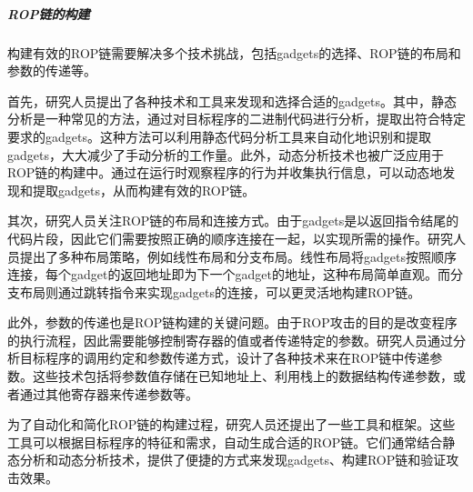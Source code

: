 \documentclass[12pt,a4paper]{ctexart}
\numberwithin{figure}{section}
\begin{document}
\subparagraph{ROP链的构建}
\par 构建有效的ROP链需要解决多个技术挑战，包括gadgets的选择、ROP链的布局和参数的传递等。
\par 首先，研究人员提出了各种技术和工具来发现和选择合适的gadgets。其中，静态分析是一种常见的方法，通过对目标程序的二进制代码进行分析，提取出符合特定要求的gadgets。这种方法可以利用静态代码分析工具来自动化地识别和提取gadgets，大大减少了手动分析的工作量。此外，动态分析技术也被广泛应用于ROP链的构建中。通过在运行时观察程序的行为并收集执行信息，可以动态地发现和提取gadgets，从而构建有效的ROP链。
\par 其次，研究人员关注ROP链的布局和连接方式。由于gadgets是以返回指令结尾的代码片段，因此它们需要按照正确的顺序连接在一起，以实现所需的操作。研究人员提出了多种布局策略，例如线性布局和分支布局。线性布局将gadgets按照顺序连接，每个gadget的返回地址即为下一个gadget的地址，这种布局简单直观。而分支布局则通过跳转指令来实现gadgets的连接，可以更灵活地构建ROP链。
\par 此外，参数的传递也是ROP链构建的关键问题。由于ROP攻击的目的是改变程序的执行流程，因此需要能够控制寄存器的值或者传递特定的参数。研究人员通过分析目标程序的调用约定和参数传递方式，设计了各种技术来在ROP链中传递参数。这些技术包括将参数值存储在已知地址上、利用栈上的数据结构传递参数，或者通过其他寄存器来传递参数等。
\par 为了自动化和简化ROP链的构建过程，研究人员还提出了一些工具和框架。这些工具可以根据目标程序的特征和需求，自动生成合适的ROP链。它们通常结合静态分析和动态分析技术，提供了便捷的方式来发现gadgets、构建ROP链和验证攻击效果。
\end{document}

